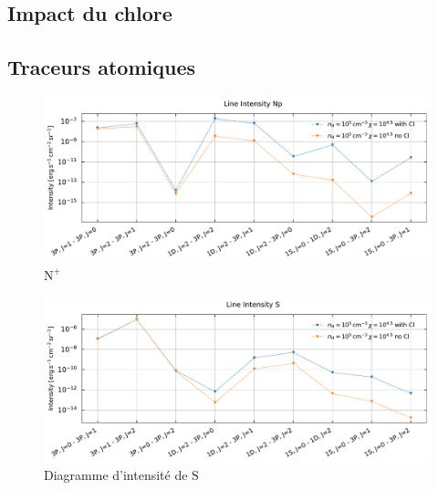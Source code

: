 \begin{appendices}




\section{Impact du chlore} 
\label{appendix:chlore}
\subsection*{Traceurs atomiques}
\begin{figure}[!h]
    \centering \includegraphics[trim = {0 0 0 1cm},clip,width=1\textwidth]{figure/Cl/gridModelEmiss/I_comp_Np.pdf}
        \caption{$\mathrm{N}^+$}
        \label{fig:cl:emiss:Np}
\end{figure}

\begin{figure}[!h]
    \centering \includegraphics[trim = {0 0 0 1cm},clip,width=1\textwidth]{figure/Cl/gridModelEmiss/I_comp_S.pdf}
        \caption{Diagramme d'intensité de $\mathrm{S}$}
        \label{fig:cl:emiss:S}
\end{figure}


\end{appendices}
